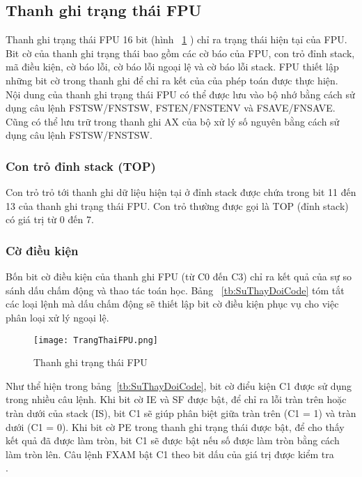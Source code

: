 		\subsection*{ Thanh ghi trạng thái FPU}
	Thanh ghi trạng thái FPU 16 bit (hình ~\ref{fig:TrangThaiFPU} ) chỉ ra trạng thái hiện tại của FPU. Bit cờ của thanh ghi trạng thái bao gồm các cờ báo của FPU, con trỏ đỉnh stack, mã điều kiện, cờ báo lỗi, cờ báo lỗi ngoại lệ và cờ báo lỗi stack. FPU thiết lập những bit cờ trong thanh ghi để chỉ ra kết của của phép toán được thực hiện.\\

	Nội dung của thanh ghi trạng thái FPU có thể được lưu vào bộ nhớ bằng cách sử dụng câu lệnh FSTSW/FNSTSW, FSTEN/FNSTENV và FSAVE/FNSAVE. Cũng có thể lưu trữ trong thanh ghi AX của bộ xử lý số nguyên bằng cách sử dụng câu lệnh FSTSW/FNSTSW.

		\subsubsection*{Con trỏ đỉnh stack (TOP)}
	Con trỏ trỏ tới thanh ghi dữ liệu hiện tại ở đỉnh stack được chứa trong bit 11 đến 13 của thanh ghi trạng thái FPU. Con trỏ thường được gọi là TOP (đỉnh stack) có giá trị từ 0 đến 7.

		\subsubsection*{ Cờ điều kiện}
	Bốn bit cờ điều kiện của thanh ghi FPU (từ C0 đến C3) chỉ ra kết quả của sự so sánh dấu chấm động và thao tác toán học. Bảng ~\ref{tb:SuThayDoiCode} tóm tắt các loại lệnh mà dấu chấm động sẽ thiết lập bit cờ điều kiện phục vụ cho việc phân loại xử lý ngoại lệ.
	
		\begin{center}
			\begin{figure}[htp]
				\begin{center}
					\texttt{[image: TrangThaiFPU.png]}
				\end{center}
				\caption{Thanh ghi trạng thái FPU \protect\footnotemark }				
				\label{fig:TrangThaiFPU}				
			\end{figure}
		\end{center}	
		
		Như thể hiện trong bảng~\ref{tb:SuThayDoiCode}, bit cờ điểu kiện C1 được sử dụng trong nhiều câu lệnh. Khi bit cờ IE và SF được bật, để chỉ ra lỗi tràn trên hoặc tràn dưới của stack (IS), bit C1 sẽ giúp phân biệt giữa tràn trên (C1 = 1) và tràn dưới (C1 = 0). Khi bit cờ PE trong thanh ghi trạng thái được bật, để cho thấy kết quả đã được làm tròn, bit C1 sẽ được bật nếu số được làm tròn bằng cách làm tròn lên. Câu lệnh FXAM bật C1 theo bit dấu của giá trị được kiểm tra\\.

